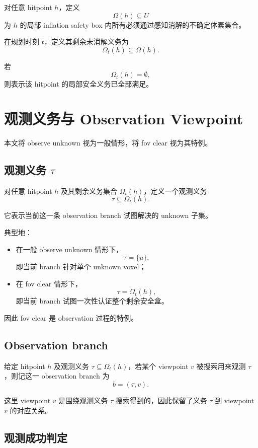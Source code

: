 \documentclass[11pt]{ctexart}
\begin{document}
对任意 hitpoint $h$，定义
\[
\Omega(h)\subseteq U
\]
为 $h$ 的局部 inflation safety box 内所有必须通过感知消解的不确定体素集合。

在规划时刻 $t$，定义其剩余未消解义务为
\[
\Omega_t(h)\subseteq \Omega(h).
\]

若
\[
\Omega_t(h)=\emptyset,
\]
则表示该 hitpoint 的局部安全义务已全部满足。

\section{观测义务与 Observation Viewpoint}

本文将 observe unknown 视为一般情形，将 fov clear 视为其特例。

\subsection{观测义务 $\tau$}

对任意 hitpoint $h$ 及其剩余义务集合 $\Omega_t(h)$，定义一个观测义务
\[
\tau \subseteq \Omega_t(h).
\]

它表示当前这一条 observation branch 试图解决的 unknown 子集。

典型地：
\begin{itemize}[leftmargin=2em]
    \item 在一般 observe unknown 情形下，
    \[
    \tau=\{u\},
    \]
    即当前 branch 针对单个 unknown voxel；
    \item 在 fov clear 情形下，
    \[
    \tau=\Omega_t(h),
    \]
    即当前 branch 试图一次性认证整个剩余安全盒。
\end{itemize}

因此 fov clear 是 observation 过程的特例。

\subsection{Observation branch}

给定 hitpoint $h$ 及观测义务 $\tau\subseteq \Omega_t(h)$，若某个 viewpoint $v$ 被搜索用来观测 $\tau$，则记这一 observation branch 为
\[
b=(\tau,v).
\]

这里 viewpoint $v$ 是围绕观测义务 $\tau$ 搜索得到的，因此保留了义务 $\tau$ 到 viewpoint $v$ 的对应关系。

\subsection{观测成功判定}
\end{document}
